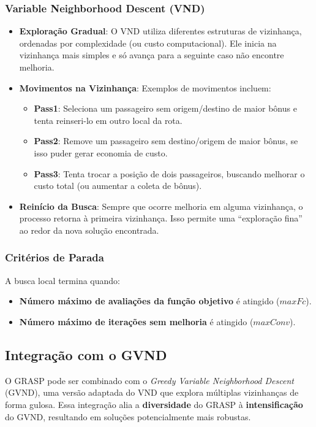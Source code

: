 \documentclass[12pt, a4paper]{report}
\begin{document}
\subsubsection*{Variable Neighborhood Descent (VND)}

\begin{itemize}
\item \textbf{Exploração Gradual}: O VND utiliza diferentes estruturas de vizinhança, ordenadas por complexidade (ou custo computacional). Ele inicia na vizinhança mais simples e só avança para a seguinte caso não encontre melhoria.
\item \textbf{Movimentos na Vizinhança}: Exemplos de movimentos incluem:
\begin{itemize}
\item \textbf{Pass1}: Seleciona um passageiro sem origem/destino de maior bônus e tenta reinseri-lo em outro local da rota.
\item \textbf{Pass2}: Remove um passageiro sem destino/origem de maior bônus, se isso puder gerar economia de custo.
\item \textbf{Pass3}: Tenta trocar a posição de dois passageiros, buscando melhorar o custo total (ou aumentar a coleta de bônus).
\end{itemize}
\item \textbf{Reinício da Busca}: Sempre que ocorre melhoria em alguma vizinhança, o processo retorna à primeira vizinhança. Isso permite uma “exploração fina” ao redor da nova solução encontrada.
\end{itemize}

\subsubsection*{Critérios de Parada}
A busca local termina quando:
\begin{itemize}
\item \textbf{Número máximo de avaliações da função objetivo} é atingido ($maxFc$).
\item \textbf{Número máximo de iterações sem melhoria} é atingido ($maxConv$).
\end{itemize}

\subsection*{Integração com o GVND}
O GRASP pode ser combinado com o \emph{Greedy Variable Neighborhood Descent} (GVND), uma versão adaptada do VND que explora múltiplas vizinhanças de forma gulosa. Essa integração alia a \textbf{diversidade} do GRASP à \textbf{intensificação} do GVND, resultando em soluções potencialmente mais robustas.
\end{document}

